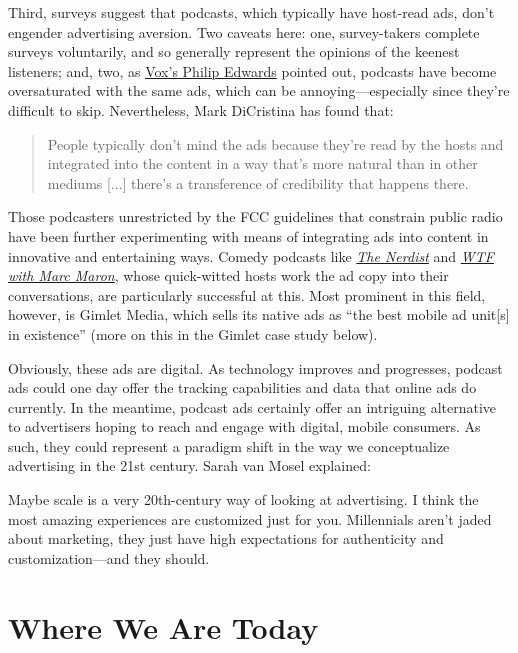\documentclass[notoc, symmetric, nobib, nols]{towcenter-guideto-book}
\begin{document}
Third, surveys suggest that podcasts, which typically have host-read ads, don't engender advertising aversion.\autocite{wolfdenraphael} Two caveats here: one, survey-takers complete surveys voluntarily, and so generally represent the opinions of the keenest listeners; and, two, as \href{http://www.vox.com/2015/9/28/9408375/podcast-ads}{Vox's Philip Edwards} pointed out, podcasts have become oversaturated with the same ads, which can be annoying---especially since they're difficult to skip.\autocite{voxphil} Nevertheless, Mark DiCristina has found that: 

\begin{quote}
People typically don't mind the ads because they're read by the hosts and integrated into the content in a way that's more natural than in other mediums [...] there's a transference of credibility that happens there.\autocite{mailchimp}
\end{quote}

Those podcasters unrestricted by the FCC guidelines that constrain public radio have been further experimenting with means of integrating ads into content in innovative and entertaining ways. Comedy podcasts like \href{http://nerdist.com/podcasts/nerdist-podcast-channel/}\textit{The Nerdist} and \textit{\href{http://www.wtfpod.com}{WTF with Marc Maron}}, whose quick-witted hosts work the ad copy into their conversations, are particularly successful at this. Most prominent in this field, however, is Gimlet Media, which sells its native ads as ``the best mobile ad unit[s] in existence'' (more on this in the Gimlet case study below).\autocite{lieber}

Obviously, these ads are digital. As technology improves and progresses, podcast ads could one day offer the tracking capabilities and data that online ads do currently. In the meantime, podcast ads certainly offer an intriguing alternative to advertisers hoping to reach and engage with digital, mobile consumers. As such, they could represent a paradigm shift in the way we conceptualize advertising in the 21st century. Sarah van Mosel explained: 

Maybe scale is a very 20th-century way of looking at advertising. I think the most amazing experiences are customized just for you. Millennials aren't jaded about marketing, they just have high expectations for authenticity and customization---and they should.\autocite{mosel}

\chapter{Where We Are Today} 
\end{document}
